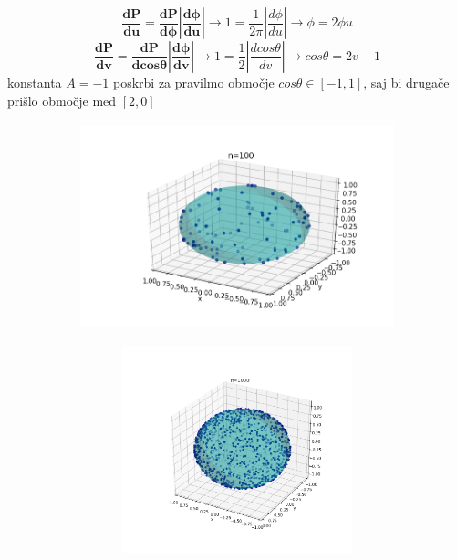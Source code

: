 \documentclass[11pt, a4paper]{article}
\begin{document}
\begin{equation}
\mathbf{\frac{dP}{d u} = \frac{dP}{d \phi }  |\frac{d \phi}{du}|}  \rightarrow 1 = \frac{1}{2 \pi}|\frac{d \phi}{du}| \rightarrow \phi = 2 \phi u
\end{equation} 
\begin{equation}
\mathbf{\frac{dP}{d v} = \frac{dP}{d cos \theta }  |\frac{d \phi}{dv}|}  \rightarrow 1 = \frac{1}{2}|\frac{d cos \theta}{dv}| \rightarrow cos\theta = 2v - 1
\end{equation} 
konstanta $A = -1$ poskrbi za pravilmo območje $cos \theta \in [-1,1]$, saj bi drugače prišlo območje med $[2,0]$


\begin{figure}[H]
 \hspace*{-2.5cm} 
  \begin{subfigure}[b]{0.65\textwidth}
  \includegraphics[width=1\textwidth, height= 6cm]{druga_krogla_1.png}
 
\end{subfigure}%
\begin{subfigure}[b]{0.65\textwidth}
  \includegraphics[width=1\textwidth, height=6cm]{druga_krogla_2.png}
 \end{subfigure}%
 
 \caption{}
\end{figure}
\end{document}
